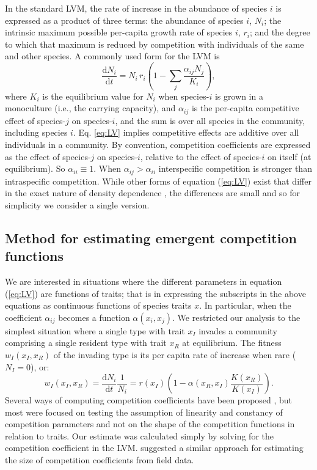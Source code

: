 \documentclass[a4paper,11pt]{article}
\newcommand{\ud}{\ensuremath{\mathrm{d}}}
\begin{document}
In the standard LVM, the rate of increase in the abundance of species $i$ is expressed as a product of three terms: the abundance of species $i$, $N_i$; the intrinsic maximum possible per-capita growth rate of species $i$, $r_i$; and the degree to which that maximum is reduced by competition with individuals of the same and other species. A commonly used form for the LVM is 
\begin{equation} \label{eq:LV} 
	\frac{\ud N_i}{\ud t} = N_i\, r_i \left(1 - \sum_j \frac{\alpha_{ij} N_j}{K_i}\right), 
\end{equation}
where $K_i$ is the equilibrium value for $N_i$ when species-$i$ is grown in a monoculture (i.e., the carrying capacity), and $\alpha_{ij}$ is the per-capita competitive effect of species-$j$ on species-$i$, and the sum is over all species in the community, including species $i$. Eq. \ref{eq:LV} implies competitive effects are additive over all individuals in a community. By convention, competition coefficients are expressed as the effect of species-$j$ on species-$i$, relative to the effect of species-$i$ on itself (at equilibrium).  So $\alpha_{ii} \equiv 1$. When $\alpha_{ij} > \alpha_{ii}$ interspecific competition is stronger than intraspecific competition. While other forms of equation (\ref{eq:LV}) exist that differ in the exact nature of density dependence \citep[e.g.][]{Leimar-2013}, the differences are small and so for simplicity we consider a single version.


\subsection{Method for estimating emergent competition functions}

We are interested in situations where the different parameters in equation (\ref{eq:LV}) are functions of traits; that is in expressing the subscripts in the above equations as continuous functions of species traits $x$. In particular, when the coefficient $\alpha_{ij}$ becomes a function $\alpha(x_i, x_j)$. We restricted our analysis to the simplest situation where a single type with trait $x_I$ invades a community comprising a single resident type with trait $x_R$ at equilibrium. The fitness $w_I(x_I, x_R)$ of the invading type is its per capita rate of increase when rare ($N_I = 0$), or: 
\begin{equation}\label{eq:LVi}
  w_I(x_I, x_R) = \frac{\ud N_i}{\ud t} \frac{1}{N_i} =
    r(x_I)\left(1 - \alpha(x_R, x_I) \frac{K(x_R)}{K(x_I)}\right).
\end{equation}
Several ways of computing competition coefficients have been proposed \citep[e.g.,][]{Abrams-1987,Abrams-2008}, but most were focused on testing the assumption of linearity and constancy of competition parameters and not on the shape of the competition functions in relation to traits. Our estimate was calculated simply by solving for the competition coefficient in the LVM. \citet{Ricklefs-1973} suggested a similar approach for estimating the size of competition coefficients from field data. 
\end{document}
